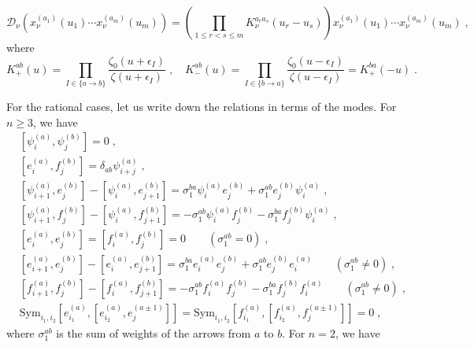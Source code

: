 \documentclass[11pt]{article}
\numberwithin{equation}{section}
\numberwithin{figure}{section}
\numberwithin{table}{section}
\begin{document}
\begin{equation}
	\mathscr{D}_\nu\left(x_\nu^{(a_1)}(u_1)\cdots x_\nu^{(a_m)}(u_m)\right)=\left(\prod\limits_{1\leq r<s\leq m}K_\nu^{a_ra_s}(u_r-u_s)\right)x_\nu^{(a_1)}(u_1)\cdots x_\nu^{(a_m)}(u_m)\;,
\end{equation}
where
\begin{equation}
	K_+^{ab}(u)=\prod_{I\in\{a\rightarrow b\}}\frac{\zeta_0(u+\epsilon_I)}{\zeta(u+\epsilon_I)}\;,\quad K_-^{ab}(u)=\prod_{I\in\{b\rightarrow a\}}\frac{\zeta_0(u-\epsilon_I)}{\zeta(u-\epsilon_I)}=K_+^{ba}(-u)\;.
\end{equation}

For the rational cases, let us write down the relations in terms of the modes. For $n\geq3$, we have
\begin{subequations}
	\begin{align}
		&\left[\psi^{(a)}_i,\psi^{(b)}_j\right]=0\;,\\
		&\left[e^{(a)}_i,f^{(b)}_j\right]=\delta_{ab}\psi^{(a)}_{i+j}\;,\\
		&\left[\psi^{(a)}_{i+1},e^{(b)}_j\right]-\left[\psi^{(a)}_i,e^{(b)}_{j+1}\right]=\sigma^{ba}_1\psi^{(a)}_ie^{(b)}_j+\sigma^{ab}_1e^{(b)}_j\psi^{(a)}_i\;,\\
		&\left[\psi^{(a)}_{i+1},f^{(b)}_j\right]-\left[\psi^{(a)}_i,f^{(b)}_{j+1}\right]=-\sigma^{ab}_1\psi^{(a)}_if^{(b)}_j-\sigma^{ba}_1f^{(b)}_j\psi^{(a)}_i\;,\\
		&\left[e^{(a)}_i,e^{(b)}_j\right]=\left[f^{(a)}_i,f^{(b)}_j\right]=0\qquad(\sigma_1^{ab}=0)\;,\\
		&\left[e^{(a)}_{i+1},e^{(b)}_j\right]-\left[e^{(a)}_i,e^{(b)}_{j+1}\right]=\sigma^{ba}_1e^{(a)}_ie^{(b)}_j+\sigma^{ab}_1e^{(b)}_je^{(a)}_i\qquad(\sigma_1^{ab}\neq0)\;,\\
		&\left[f^{(a)}_{i+1},f^{(b)}_j\right]-\left[f^{(a)}_i,f^{(b)}_{j+1}\right]=-\sigma^{ab}_1f^{(a)}_if^{(b)}_j-\sigma^{ba}_1f^{(b)}_jf^{(a)}_i\qquad(\sigma_1^{ab}\neq0)\;,\\
		&\mathrm{Sym}_{i_1,i_2}\left[e^{(a)}_{i_1},\left[e^{(a)}_{i_2},e^{(a\pm1)}_j\right]\right]=\mathrm{Sym}_{i_1,i_2}\left[f^{(a)}_{i_1},\left[f^{(a)}_{i_2},f^{(a\pm1)}_j\right]\right]=0\;,
	\end{align}
\end{subequations}
where $\sigma^{ab}_1$ is the sum of weights of the arrows from $a$ to $b$. For $n=2$, we have
\end{document}
